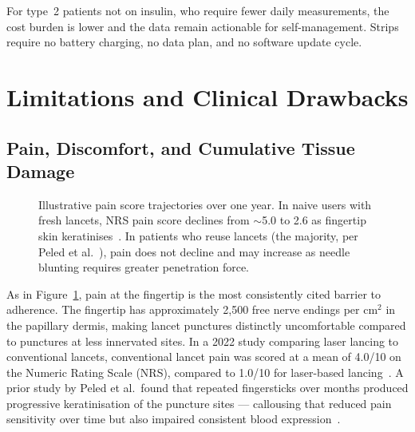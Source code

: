 For type~2 patients not on insulin, who require fewer daily measurements, the cost burden is lower and the data remain actionable for self-management. Strips require no battery charging, no data plan, and no software update cycle.

\section{Limitations and Clinical Drawbacks}

\subsection*{Pain, Discomfort, and Cumulative Tissue Damage}

\begin{figure}[H]
\centering
{}
\caption{Illustrative pain score trajectories over one year. In naive users with fresh lancets, NRS pain score declines from $\sim$5.0 to 2.6 as fingertip skin keratinises~\cite{laser2022}. In patients who reuse lancets (the majority, per Peled et al.~\cite{peled2012}), pain does not decline and may increase as needle blunting requires greater penetration force.}
\label{fig:fingerstick_pain}
\end{figure}

As in Figure~\ref{fig:fingerstick_pain}, pain at the fingertip is the most consistently cited barrier to adherence. The fingertip has approximately 2,500 free nerve endings per cm$^2$ in the papillary dermis, making lancet punctures distinctly uncomfortable compared to punctures at less innervated sites. In a 2022 study comparing laser lancing to conventional lancets, conventional lancet pain was scored at a mean of 4.0/10 on the Numeric Rating Scale (NRS), compared to 1.0/10 for laser-based lancing~\cite{laser2022}. A prior study by Peled et al.\ found that repeated fingersticks over months produced progressive keratinisation of the puncture sites --- callousing that reduced pain sensitivity over time but also impaired consistent blood expression~\cite{peled2012}.

